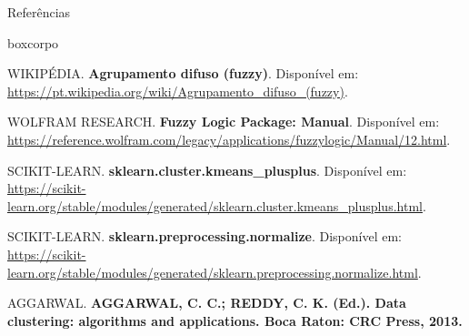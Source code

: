 \documentclass[aspectratio=43]{beamer}
\begin{document}
\begin{frame}[t]{Referências}

\vspace{0.5cm}

\scriptsize
\begin{beamercolorbox}[wd=0.90\paperwidth, sep=0.25cm]{boxcorpo}

WIKIPÉDIA. \textbf{Agrupamento difuso (fuzzy)}. Disponível em: 
\url{https://pt.wikipedia.org/wiki/Agrupamento_difuso_(fuzzy)}. 

\vspace{0.18cm}

WOLFRAM RESEARCH. \textbf{Fuzzy Logic Package: Manual}. Disponível em: 
\url{https://reference.wolfram.com/legacy/applications/fuzzylogic/Manual/12.html}. 

\vspace{0.18cm}

SCIKIT-LEARN. \textbf{sklearn.cluster.kmeans\_plusplus}. Disponível em: 
\url{https://scikit-learn.org/stable/modules/generated/sklearn.cluster.kmeans_plusplus.html}. 

\vspace{0.18cm}

SCIKIT-LEARN. \textbf{sklearn.preprocessing.normalize}. Disponível em: 
\url{https://scikit-learn.org/stable/modules/generated/sklearn.preprocessing.normalize.html}. 

\vspace{0.18cm}

AGGARWAL. \textbf{AGGARWAL, C. C.; REDDY, C. K. (Ed.). Data clustering: algorithms and applications. Boca Raton: CRC Press, 2013.}

\end{beamercolorbox}

\end{frame}
\end{document}
